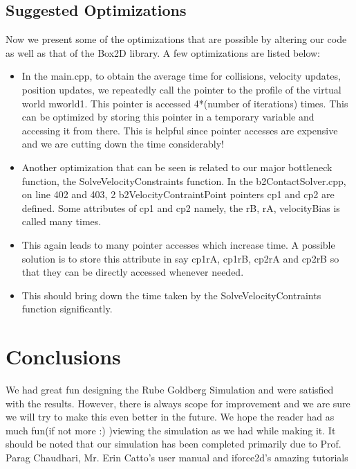 \documentclass[11pt]{article}
\begin{document}
	\subsection{Suggested Optimizations}
		Now we present some of the optimizations that are possible by altering our code as well as that of the Box2D library. A few optimizations are listed below:
		\begin{itemize}
			\item In the main.cpp, to obtain the average time for collisions, velocity updates, position updates, we repeatedly call the pointer to the profile of the virtual world mworld1. This pointer is accessed 4*(number of iterations) times. This can be optimized by storing this pointer in a temporary variable and accessing it from there. This is helpful since pointer accesses are expensive and we are cutting down the time considerably!
			\item Another optimization that can be seen is related to our major bottleneck function, the SolveVelocityConstraints function. In the b2ContactSolver.cpp, on line 402 and 403, 2 b2VelocityContraintPoint pointers cp1 and cp2 are defined. Some attributes of cp1 and cp2 namely, the rB, rA, velocityBias is called many times.
			\item This again leads to many pointer accesses which increase time. A possible solution is to store this attribute in say cp1rA, cp1rB, cp2rA and cp2rB so that they can be directly accessed whenever needed. 
			\item This should bring down the time taken by the SolveVelocityContraints function significantly.
	\end{itemize}


\section{Conclusions}
We had great fun designing the Rube Goldberg Simulation and were satisfied with the results. 
However, there is always scope for improvement and we are sure we will try to make this even better in the future. We hope the reader had as much fun(if not more :) )viewing the simulation as we had while making it. It should be noted that our simulation has been completed primarily due to Prof. Parag Chaudhari, Mr. Erin Catto's user manual\cite{box2dman}
and iforce2d's amazing tutorials\cite{iforce}


\end{document}
